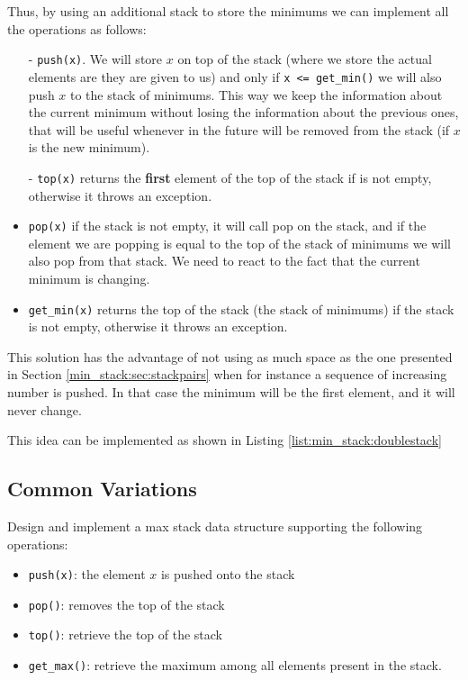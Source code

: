 Thus, by using an additional stack to store the minimums we can implement all the operations as follows:
\begin{itemize}
	\item[-]\lstinline[columns=fixed]{push(x)}. We will store $x$ on top of the  stack (where we store the actual elements are they are given to us)  and only if  \lstinline[columns=fixed]{x <= get_min()} we will also push $x$ to the stack of minimums. This way we keep the information about the current minimum without losing the information about the previous ones, that will be useful whenever in the future will be removed from the stack (if $x$ is the new minimum).
	\item[-]\lstinline[columns=fixed]{top(x)}  returns the \textbf{first} element of the top of the  stack if is not empty, otherwise it throws an exception.
	\item[-]\lstinline[columns=fixed]{pop(x)} if the stack is not empty, it will call pop on the  stack, and if the element we are popping is equal to the top of the stack of minimums we will also pop from that stack. We need to react to the fact that the current minimum is changing.
	\item[-]\lstinline[columns=fixed]{get_min(x)}  returns the top of the  stack (the stack of minimums) if the stack is not empty, otherwise it throws an exception.
\end{itemize}
This solution has the advantage of not using as much space as the one presented in Section \ref{min_stack:sec:stackpairs} when for instance a sequence of  increasing number is pushed. In that case the minimum will be the first element, and it will never change.

This idea can be implemented as shown in Listing \ref{list:min_stack:doublestack}

 


\subsection{Common Variations}
\begin{exercise}
	 Design and implement a max stack data structure supporting the following operations:
\begin{itemize}
	\item \lstinline[columns=fixed]{push(x)}: the element $x$ is pushed onto the stack
	\item \lstinline[columns=fixed]{pop()}: removes the top of the stack
	\item \lstinline[columns=fixed]{top()}: retrieve the top of the stack
	\item \lstinline[columns=fixed]{get_max()}: retrieve the maximum among all elements present in the stack.
\end{itemize}

\end{exercise}